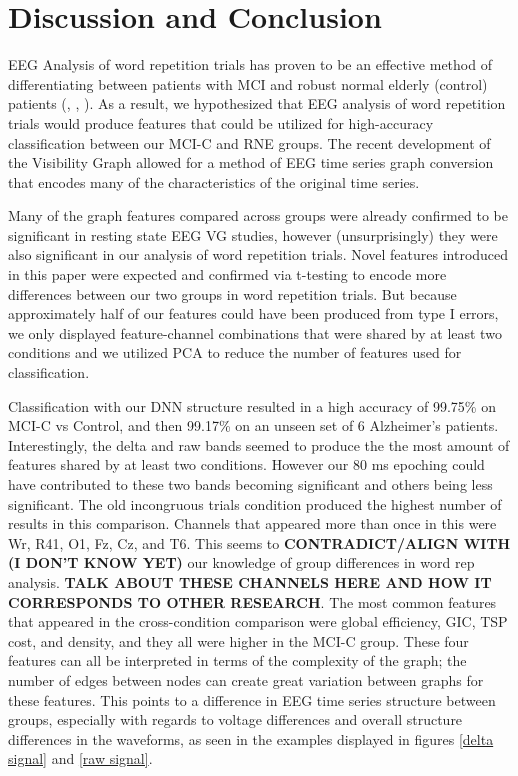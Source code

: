 \documentclass[Afour,times,sageh]{sagej}
\begin{document}
\section{Discussion and Conclusion}
EEG Analysis of word repetition trials has proven to be an effective method of differentiating between patients with MCI and robust normal elderly (control) patients (\citet{OlichneyN400}, \citet{OlchneyP600}, \citet{TaylorERP}). As a result, we hypothesized that EEG analysis of word repetition trials would produce features that could be utilized for high-accuracy classification between our MCI-C and RNE groups. The recent development of the Visibility Graph allowed for a method of EEG time series graph conversion that encodes many of the characteristics of the original time series. 

Many of the graph features compared across groups were already confirmed to be significant in resting state EEG VG studies, however (unsurprisingly) they were also significant in our analysis of word repetition trials. Novel features introduced in this paper were expected and confirmed via t-testing to encode more differences between our two groups in word repetition trials. But because approximately half of our features could have been produced from type I errors, we only displayed feature-channel combinations that were shared by at least two conditions and we utilized PCA to reduce the number of features used for classification. 

Classification with our DNN structure resulted in a high accuracy of 99.75\% on MCI-C vs Control, and then 99.17\% on an unseen set of 6 Alzheimer's patients. Interestingly, the delta and raw bands seemed to produce the the most amount of features shared by at least two conditions. However our 80 ms epoching could have contributed to these two bands becoming significant and others being less significant. The old incongruous trials condition produced the highest number of results in this comparison. Channels that appeared more than once in this were Wr, R41, O1, Fz, Cz, and T6. This seems to \textbf{CONTRADICT/ALIGN WITH (I DON'T KNOW YET)} our knowledge of group differences in word rep analysis. \textbf{TALK ABOUT THESE CHANNELS HERE AND HOW IT CORRESPONDS TO OTHER RESEARCH}. 
The most common features that appeared in the cross-condition comparison were global efficiency, GIC, TSP cost, and density, and they all were higher in the MCI-C group. These four features can all be interpreted in terms of the complexity of the graph; the number of edges between nodes can create great variation between graphs for these features. This points to a difference in EEG time series structure between groups, especially with regards to voltage differences and overall structure differences in the waveforms, as seen in the examples displayed in figures \ref{delta signal} and \ref{raw signal}.
\end{document}
